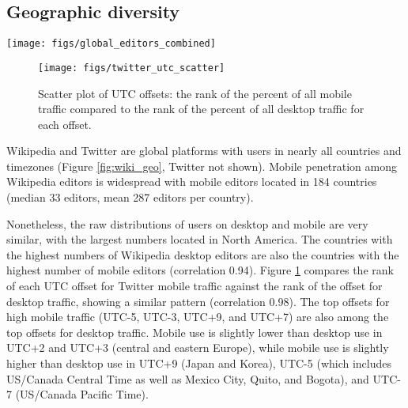 \documentclass{sigchi}
\begin{document}
\subsection{Geographic diversity}
\begin{figure*}
	\begin{center}
		\texttt{[image: figs/global\_editors\_combined]}%
		\caption{Geolocation of Wikipedia editors on desktop (left) and mobile (right) devices.}
		\label{fig:wiki_geo}
	\end{center}
\end{figure*}


\begin{figure}
	\begin{center}
		\texttt{[image: figs/twitter\_utc\_scatter]}%
		\caption{Scatter plot of UTC offsets: the rank of the percent of all mobile traffic compared to the rank of the percent of all desktop traffic for each offset.}
		\label{fig:tw_scatter}
	\end{center}
\end{figure}

Wikipedia and Twitter are global platforms with users in nearly all countries and timezones (Figure \ref{fig:wiki_geo}, Twitter not shown). Mobile penetration among Wikipedia editors is widespread with mobile editors located in 184 countries (median 33 editors, mean 287 editors per country).


Nonetheless, the raw distributions of users on desktop and mobile are very similar, with the largest numbers located in North America. The countries with the highest numbers of Wikipedia desktop editors are also the countries with the highest number of mobile editors (correlation 0.94).
Figure \ref{fig:tw_scatter} compares the rank of each UTC offset for Twitter mobile traffic against the rank of the offset for desktop traffic, showing a similar pattern (correlation 0.98). The top offsets for high mobile traffic (UTC-5, UTC-3, UTC+9, and UTC+7) are also among the top offsets for desktop traffic. Mobile use is slightly lower than desktop use in UTC+2 and UTC+3 (central and eastern Europe), while mobile use is slightly higher than desktop use in UTC+9 (Japan and Korea), UTC-5 (which includes US\slash{}Canada Central Time as well as Mexico City, Quito, and Bogota), and UTC-7 (US\slash{}Canada Pacific Time).
\end{document}
